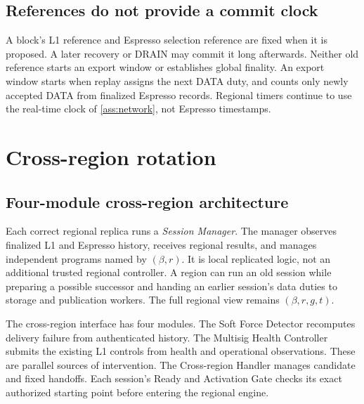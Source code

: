 \documentclass[11pt,a4paper]{article}
\newcommand{\defterm}[1]{\textcolor{rrBlue}{\textit{#1}}}
\newcounter{protocol}
\begin{document}
\subsection{References do not provide a commit clock}
\label{sec:late-receipt}
A block's L1 reference and Espresso selection reference are fixed when
it is proposed. A later recovery or DRAIN may commit it long afterwards.
Neither old reference starts an export window or establishes global
finality. An export window starts when replay assigns the next DATA
duty, and counts only newly accepted DATA from finalized Espresso
records. Regional timers continue to use the real-time clock of
\cref{ass:network}, not Espresso timestamps.

\section{Cross-region rotation}
\label{sec:xprotocols}

\subsection{Four-module cross-region architecture}
\label{sec:runtime-modules}
Each correct regional replica runs a \defterm{Session Manager}. The
manager observes finalized L1 and Espresso history, receives regional
results, and manages independent programs named by $(\beta,r)$.
It is local replicated logic, not an additional trusted regional
controller. A region can run an old session while preparing a possible
successor and handing an earlier session's data duties to storage and
publication workers. The full regional view remains $(\beta,r,g,t)$.

The cross-region interface has four modules. The Soft Force Detector
recomputes delivery failure from authenticated history. The Multisig
Health Controller submits the existing L1 controls from health and
operational observations. These are parallel sources of intervention.
The Cross-region Handler manages candidate and fixed handoffs. Each
session's Ready and Activation Gate checks its exact authorized starting
point before entering the regional engine.
\end{document}
